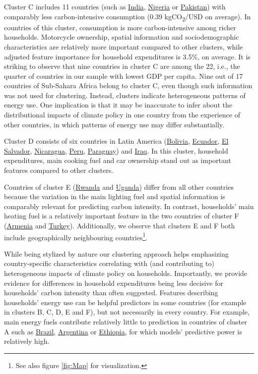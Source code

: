 \documentclass[12pt, a4paper]{article}
\begin{document}
Cluster C includes 11 countries (such as \hyperref[fig:5b_IND]{India}, \hyperref[fig:5b_NGA]{Nigeria} or \hyperref[fig:5b_PAK]{Pakistan}) with comparably less carbon-intensive consumption (0.39 kgCO\textsubscript{2}/USD on average). In countries of this cluster, consumption is more carbon-intensive among richer households. Motorcycle ownership, spatial information and sociodemographic characteristics are relatively more important compared to other clusters, while adjusted feature importance for household expenditures is 3.5\%, on average. It is striking to observe that nine countries in cluster C are among the 22, i.e., the quarter of countries in our sample with lowest GDP per capita. Nine out of 17 countries of Sub-Sahara Africa belong to cluster C, even though such information was not used for clustering. Instead, clusters indicate heterogeneous patterns of energy use. One implication is that it may be inaccurate to infer about the distributional impacts of climate policy in one country from the experience of other countries, in which patterns of energy use may differ substantially.

Cluster D consists of six countries in Latin America (\hyperref[fig:5b_BOL]{Bolivia}, \hyperref[fig:5b_ECU]{Ecuador}, \hyperref[fig:5b_SLV]{El Salvador}, \hyperref[fig:5b_NIC]{Nicaragua}, \hyperref[fig:5b_PER]{Peru}, \hyperref[fig:5b_PRY]{Paraguay}) and \hyperref[fig:5b_IRQ]{Iraq}. In this cluster, household expenditures, main cooking fuel and car ownership stand out as important features compared to other clusters. 

Countries of cluster E (\hyperref[fig:5b_RWA]{Rwanda} and \hyperref[fig:5b_UGA]{Uganda}) differ from all other countries because the variation in the main lighting fuel and spatial information is comparably relevant for predicting carbon intensity. In contrast, households' main heating fuel is a relatively important feature in the two countries of cluster F (\hyperref[fig:5b_ARM]{Armenia} and \hyperref[fig:5b_TUR]{Turkey}). Additionally, we observe that clusters E and F both include geographically neighbouring countries\footnote{See also figure \ref{fig:Map} for visualization.}.

While being stylized by nature our clustering approach helps emphasizing country-specific characteristics correlating with (and contributing to) heterogeneous impacts of climate policy on households. Importantly, we provide evidence for differences in household expenditures being less decisive for households' carbon intensity than often suggested. Features describing households' energy use can be helpful predictors in some countries (for example in clusters B, C, D, E and F), but not necessarily in every country. For example, main energy fuels contribute relatively little to prediction in countries of cluster A such as \hyperref[fig:5b_BRA]{Brazil}, \hyperref[fig:5b_URY]{Argentina} or \hyperref[fig:5b_ETH]{Ethiopia}, for which models' predictive power is relatively high.
\end{document}
